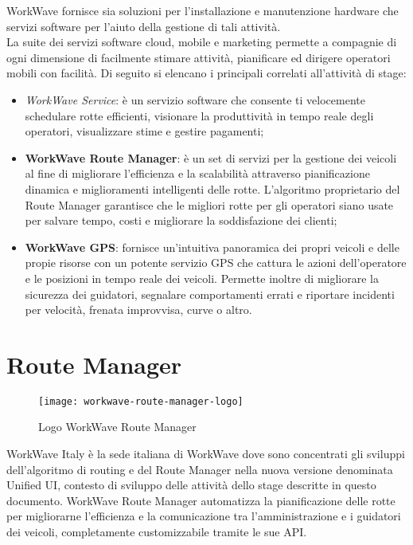 WorkWave fornisce sia soluzioni per l'installazione e manutenzione hardware che servizi software per l'aiuto della gestione di tali attività. \\

La suite dei servizi software cloud, mobile e marketing permette a compagnie di ogni dimensione di facilmente stimare attività, pianificare ed dirigere operatori mobili con facilità. Di seguito si elencano i principali correlati all'attività di stage:

\begin{itemize}
  \item \textit{WorkWave Service}: è un servizio software che consente ti velocemente schedulare rotte efficienti, visionare la produttività in tempo reale degli operatori, visualizzare stime e gestire pagamenti;
  \item \textbf{WorkWave Route Manager}: è un set di servizi per la gestione dei veicoli al fine di migliorare l'efficienza e la scalabilità attraverso pianificazione dinamica e miglioramenti intelligenti delle rotte. L'algoritmo proprietario del Route Manager garantisce che le migliori rotte per gli operatori siano usate per salvare tempo, costi e migliorare la soddisfazione dei clienti;
  \item \textbf{WorkWave GPS}: fornisce un'intuitiva panoramica dei propri veicoli e delle propie risorse con un potente servizio GPS che cattura le azioni dell'operatore e le posizioni in tempo reale dei veicoli. Permette inoltre di migliorare la sicurezza dei guidatori, segnalare comportamenti errati e riportare incidenti per velocità, frenata improvvisa, curve o altro.
\end{itemize}

\section{Route Manager}

\begin{figure}[h] 
  \centering 
  \texttt{[image: workwave-route-manager-logo]} 
  \caption{Logo WorkWave Route Manager}
\end{figure}

WorkWave Italy è la sede italiana di WorkWave dove sono concentrati gli sviluppi dell'algoritmo di routing e del Route Manager nella nuova versione denominata Unified UI, contesto di sviluppo delle attività dello stage descritte in questo documento.
WorkWave Route Manager automatizza la pianificazione delle rotte per migliorarne l'efficienza e la comunicazione tra l'amministrazione e i guidatori dei veicoli, completamente customizzabile tramite le sue API. \\

